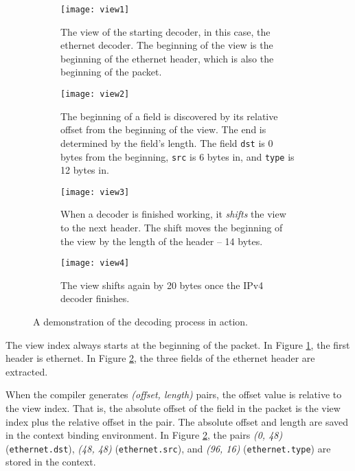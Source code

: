 \begin{figure}[ht]
\begin{subfigure}[t]{.45\textwidth}
  \centering
  \texttt{[image: view1]}
  \caption{The view of the starting decoder, in this case, the ethernet
decoder. The beginning of the view is the beginning of the ethernet
header, which is also the beginning of the packet.}
  \label{fg:view1}
\end{subfigure}%
\hfill
\begin{subfigure}[t]{.5\textwidth}
  \centering
  \texttt{[image: view2]}
  \caption{The beginning of a field is discovered by its relative offset from
the beginning of the view. The end is determined by the field's length. The
field \texttt{dst} is 0 bytes from the beginning, \texttt{src} is 6 bytes in,
and \texttt{type} is 12 bytes in.}
  \label{fg:view2}
\end{subfigure}

\begin{subfigure}[t]{.45\textwidth}
  \centering
  \texttt{[image: view3]}
  \caption{When a decoder is finished working, it \textit{shifts} the view to
the next header. The shift moves the beginning of the view by the length of the
header -- 14 bytes.}
  \label{fg:view3}
\end{subfigure}%
\hfill
\begin{subfigure}[t]{.45\textwidth}
  \centering
  \texttt{[image: view4]}
  \caption{The view shifts again by 20 bytes once the IPv4 decoder finishes.}
  \label{fg:view4}
\end{subfigure}
\caption{A demonstration of the decoding process in action.}
\label{fg:decoding}
\end{figure}

 
The view index always starts at the beginning of the packet.
In Figure \ref{fg:view1}, the first header is ethernet.
In Figure \ref{fg:view2}, the three fields of the ethernet header
are extracted.

When the compiler generates \textit{(offset, length)} pairs,
the offset value is relative to the view index. That is, the
absolute offset of the field in the packet is the view index plus 
the relative offset in the pair.
The absolute offset and length are saved in the context binding environment.
In Figure \ref{fg:view2}, the pairs \textit{(0, 48)} (\texttt{ethernet.dst}),
\textit{(48, 48)} (\texttt{ethernet.src}), and \textit{(96, 16)} 
(\texttt{ethernet.type}) are stored in the context.

